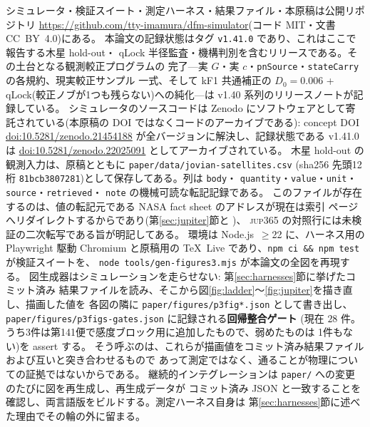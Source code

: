 \documentclass[a4paper,10pt,twocolumn]{ltjsarticle}
\begin{document}
シミュレータ・検証スイート・測定ハーネス・結果ファイル・本原稿は公開リポジトリ
\url{https://github.com/tty-imamura/dfm-simulator}(コード MIT・文書 CC~BY~4.0)にある。
本論文の記録状態はタグ \texttt{v1.41.0} であり、これはここで報告する木星 hold-out・
qLock 半径監査・機構判別を含むリリースである。その土台となる観測較正プログラムの
完了---実 $G$・実 $c$・\texttt{pnSource}・\texttt{stateCarry} の各規約、現実較正サンプル
一式、そして kF1 共通補正の $D_0=0.006$ + qLock(較正ノブが1つも残らない)への純化---は
v1.40 系列のリリースノートが記録している。
シミュレータのソースコードは Zenodo にソフトウェアとして寄託されている(本原稿の
DOI ではなくコードのアーカイブである): concept DOI
\href{https://doi.org/10.5281/zenodo.21454188}%
{doi:10.5281/zenodo.21454188} が全バージョンに解決し、記録状態である v1.41.0 は
\href{https://doi.org/10.5281/zenodo.22025091}%
{doi:10.5281/zenodo.22025091} としてアーカイブされている。
木星 hold-out の観測入力は、原稿とともに
\texttt{paper/\allowbreak data/\allowbreak jovian-\allowbreak satellites.csv}
(sha256 先頭12桁 \texttt{81bcb3807281})として保存してある。列は \texttt{body}・
\texttt{quantity}・\texttt{value}・\texttt{unit}・\texttt{source}・\texttt{retrieved}・
\texttt{note} の機械可読な転記記録である。
このファイルが存在するのは、値の転記元である NASA fact sheet のアドレスが現在は索引
ページへリダイレクトするからであり(第\ref{sec:jupiter}節と \cite{NASASats})、
\textsc{jup365} の対照行には未検証の二次転写である旨が明記してある。
環境は Node.js~$\geq$22 に、ハーネス用の Playwright 駆動 Chromium と原稿用の TeX~Live
であり、\texttt{npm ci \&\& npm test} が検証スイートを、
\texttt{node tools/gen-figures3.mjs} が本論文の全図を再現する。
図生成器はシミュレーションを走らせない: 第\ref{sec:harnesses}節に挙げたコミット済み
結果ファイルを読み、そこから図\ref{fig:ladder}〜\ref{fig:jupiter}を描き直し、描画した値を
各図の隣に \texttt{paper/figures/p3fig*.json} として書き出し、
\texttt{paper/figures/p3figs-gates.json} に記録される\textbf{回帰整合ゲート}
(現在 $28$ 件。うち3件は第141便で感度ブロック用に追加したもので、弱めたものは
1件もない)を assert する。
そう呼ぶのは、これらが描画値をコミット済み結果ファイルおよび互いと突き合わせるもので
あって測定ではなく、通ることが物理についての証拠ではないからである。
継続的インテグレーションは \texttt{paper/} への変更のたびに図を再生成し、再生成データが
コミット済み JSON と一致することを確認し、両言語版をビルドする。測定ハーネス自身は
第\ref{sec:harnesses}節に述べた理由でその輪の外に留まる。
\end{document}
